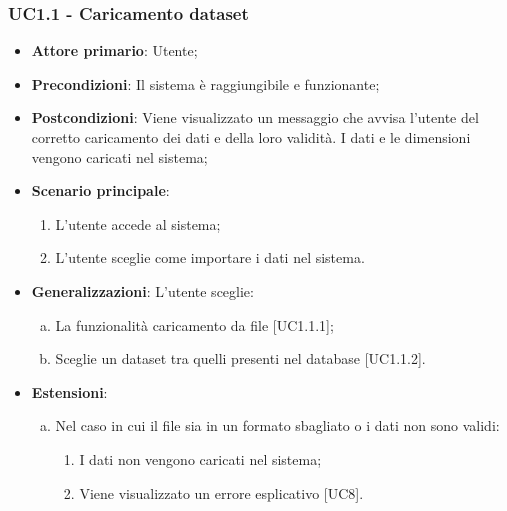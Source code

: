 \subsubsection{UC1.1 - Caricamento dataset}

\begin{itemize}
	\item \textbf{Attore primario}: Utente;
	\item \textbf{Precondizioni}: Il sistema è raggiungibile e funzionante;
	\item \textbf{Postcondizioni}: Viene visualizzato un messaggio che avvisa l'utente del corretto caricamento dei dati e della loro validità. I dati e le dimensioni vengono caricati nel sistema;
	\item \textbf{Scenario principale}:
		\begin{enumerate}
			\item L'utente accede al sistema;
			\item L'utente sceglie come importare i dati nel sistema.
			
		\end{enumerate}
		
	\item \textbf{Generalizzazioni}: L'utente sceglie:
	\begin{enumerate}[(a)]
			\item La funzionalità caricamento da file [UC1.1.1];
			\item Sceglie un dataset tra quelli presenti nel database [UC1.1.2].
			\end{enumerate}
	
	\item \textbf{Estensioni}:
	\begin{enumerate}[(a)]
		\item Nel caso in cui il file sia in un formato sbagliato o i dati non sono validi:
		\begin{enumerate}[1.]
			\item I dati non vengono caricati nel sistema;
			\item Viene visualizzato un errore esplicativo [UC8].
		\end{enumerate}
	\end{enumerate}
\end{itemize}

